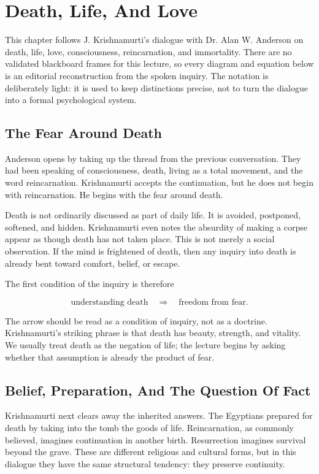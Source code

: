\chapter{Death, Life, And Love}

This chapter follows J. Krishnamurti's dialogue with Dr. Alan W. Anderson on death, life, love, consciousness, reincarnation, and immortality. There are no validated blackboard frames for this lecture, so every diagram and equation below is an editorial reconstruction from the spoken inquiry. The notation is deliberately light: it is used to keep distinctions precise, not to turn the dialogue into a formal psychological system.

\section{The Fear Around Death}

Anderson opens by taking up the thread from the previous conversation. They had been speaking of consciousness, death, living as a total movement, and the word reincarnation. Krishnamurti accepts the continuation, but he does not begin with reincarnation. He begins with the fear around death.

Death is not ordinarily discussed as part of daily life. It is avoided, postponed, softened, and hidden. Krishnamurti even notes the absurdity of making a corpse appear as though death has not taken place. This is not merely a social observation. If the mind is frightened of death, then any inquiry into death is already bent toward comfort, belief, or escape.

The first condition of the inquiry is therefore

\begin{equation}
\text{understanding death}
\quad\Longrightarrow\quad
\text{freedom from fear}.
\end{equation}

The arrow should be read as a condition of inquiry, not as a doctrine. Krishnamurti's striking phrase is that death has beauty, strength, and vitality. We usually treat death as the negation of life; the lecture begins by asking whether that assumption is already the product of fear.

\section{Belief, Preparation, And The Question Of Fact}

Krishnamurti next clears away the inherited answers. The Egyptians prepared for death by taking into the tomb the goods of life. Reincarnation, as commonly believed, imagines continuation in another birth. Resurrection imagines survival beyond the grave. These are different religious and cultural forms, but in this dialogue they have the same structural tendency: they preserve continuity.

